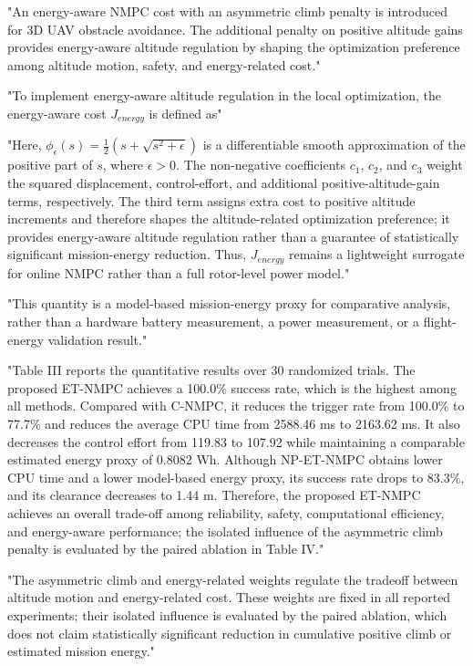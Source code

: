 \documentclass[12pt, twosides]{article}
\theoremstyle{definition}
\begin{document}
"An energy-aware NMPC cost with an asymmetric climb penalty is introduced for 3D UAV obstacle avoidance. The additional penalty on positive altitude gains provides energy-aware altitude regulation by shaping the optimization preference among altitude motion, safety, and energy-related cost."

"To implement energy-aware altitude regulation in the local optimization, the energy-aware cost $J_{energy}$ is defined as"

"Here, $\phi_{\epsilon}(s)=\frac{1}{2}\left(s+\sqrt{s^2+\epsilon}\right)$ is a differentiable smooth approximation of the positive part of $s$, where $\epsilon>0$. The non-negative coefficients $c_1$, $c_2$, and $c_3$ weight the squared displacement, control-effort, and additional positive-altitude-gain terms, respectively. The third term assigns extra cost to positive altitude increments and therefore shapes the altitude-related optimization preference; it provides energy-aware altitude regulation rather than a guarantee of statistically significant mission-energy reduction. Thus, $J_{energy}$ remains a lightweight surrogate for online NMPC rather than a full rotor-level power model."

"This quantity is a model-based mission-energy proxy for comparative analysis, rather than a hardware battery measurement, a power measurement, or a flight-energy validation result."

"Table III reports the quantitative results over 30 randomized trials. The proposed ET-NMPC achieves a 100.0\% success rate, which is the highest among all methods. Compared with C-NMPC, it reduces the trigger rate from 100.0\% to 77.7\% and reduces the average CPU time from 2588.46 ms to 2163.62 ms. It also decreases the control effort from 119.83 to 107.92 while maintaining a comparable estimated energy proxy of 0.8082 Wh. Although NP-ET-NMPC obtains lower CPU time and a lower model-based energy proxy, its success rate drops to 83.3\%, and its clearance decreases to 1.44 m. Therefore, the proposed ET-NMPC achieves an overall trade-off among reliability, safety, computational efficiency, and energy-aware performance; the isolated influence of the asymmetric climb penalty is evaluated by the paired ablation in Table IV."

"The asymmetric climb and energy-related weights regulate the tradeoff between altitude motion and energy-related cost. These weights are fixed in all reported experiments; their isolated influence is evaluated by the paired ablation, which does not claim statistically significant reduction in cumulative positive climb or estimated mission energy."
\end{document}
